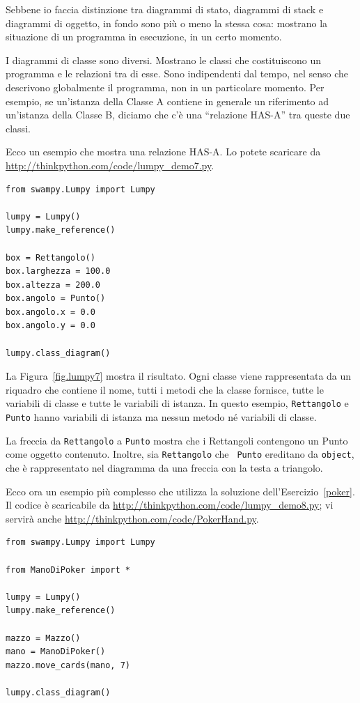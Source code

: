 \documentclass[10pt]{book}
\begin{document}
Sebbene io faccia distinzione tra diagrammi di stato, diagrammi di stack e diagrammi di oggetto, in fondo sono più o meno la stessa cosa: mostrano la situazione di un programma in esecuzione, in un certo momento.

I diagrammi di classe sono diversi. Mostrano le classi che costituiscono un programma e le relazioni tra di esse. Sono indipendenti dal tempo, nel senso che descrivono globalmente il programma, non in un particolare momento. Per esempio, se un'istanza della Classe A contiene in generale un riferimento ad un'istanza della Classe B, diciamo che c'è una ``relazione HAS-A'' tra queste due classi.

Ecco un esempio che mostra una relazione HAS-A. Lo potete scaricare da \url{http://thinkpython.com/code/lumpy_demo7.py}.

\begin{verbatim}
from swampy.Lumpy import Lumpy

lumpy = Lumpy()
lumpy.make_reference()

box = Rettangolo()
box.larghezza = 100.0
box.altezza = 200.0
box.angolo = Punto()
box.angolo.x = 0.0
box.angolo.y = 0.0

lumpy.class_diagram()
\end{verbatim}

La Figura~\ref{fig.lumpy7} mostra il risultato. Ogni classe viene rappresentata da un riquadro che contiene il nome, tutti i metodi che la classe fornisce, tutte le variabili di classe e tutte le variabili di istanza. In questo esempio, {\tt Rettangolo} e {\tt Punto} hanno variabili di istanza ma nessun metodo né variabili di classe.

La freccia da {\tt Rettangolo} a {\tt Punto} mostra che i Rettangoli contengono un Punto come oggetto contenuto. Inoltre, sia {\tt Rettangolo} che {\tt
  Punto} ereditano da {\tt object}, che è rappresentato nel diagramma da una freccia con la testa a triangolo.

Ecco ora un esempio più complesso che utilizza la soluzione dell'Esercizio~\ref{poker}.
Il codice è scaricabile da  \url{http://thinkpython.com/code/lumpy_demo8.py};
vi servirà anche \url{http://thinkpython.com/code/PokerHand.py}.

\begin{verbatim}
from swampy.Lumpy import Lumpy

from ManoDiPoker import *

lumpy = Lumpy()
lumpy.make_reference()

mazzo = Mazzo()
mano = ManoDiPoker()
mazzo.move_cards(mano, 7)

lumpy.class_diagram()
\end{verbatim}
\end{document}
